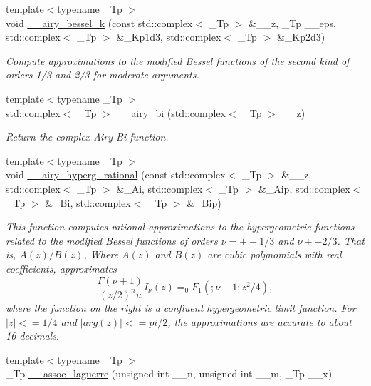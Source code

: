 \begin{DoxyCompactItemize}
\item 
{\footnotesize template$<$typename \+\_\+\+Tp $>$ }\\void \hyperlink{namespacestd_1_1____detail_a01098dbe1615b5be0833a7f3573f6510}{\+\_\+\+\_\+airy\+\_\+bessel\+\_\+k} (const std\+::complex$<$ \+\_\+\+Tp $>$ \&\+\_\+\+\_\+z, \+\_\+\+Tp \+\_\+\+\_\+eps, std\+::complex$<$ \+\_\+\+Tp $>$ \&\+\_\+\+Kp1d3, std\+::complex$<$ \+\_\+\+Tp $>$ \&\+\_\+\+Kp2d3)
\begin{DoxyCompactList}\small\item\em Compute approximations to the modified Bessel functions of the second kind of orders 1/3 and 2/3 for moderate arguments. \end{DoxyCompactList}\item 
{\footnotesize template$<$typename \+\_\+\+Tp $>$ }\\std\+::complex$<$ \+\_\+\+Tp $>$ \hyperlink{namespacestd_1_1____detail_ae5536305d721e393efe1a74f0e57653e}{\+\_\+\+\_\+airy\+\_\+bi} (std\+::complex$<$ \+\_\+\+Tp $>$ \+\_\+\+\_\+z)
\begin{DoxyCompactList}\small\item\em Return the complex Airy Bi function. \end{DoxyCompactList}\item 
{\footnotesize template$<$typename \+\_\+\+Tp $>$ }\\void \hyperlink{namespacestd_1_1____detail_aedc8a8cc144aa56f72728db7d62e3e62}{\+\_\+\+\_\+airy\+\_\+hyperg\+\_\+rational} (const std\+::complex$<$ \+\_\+\+Tp $>$ \&\+\_\+\+\_\+z, std\+::complex$<$ \+\_\+\+Tp $>$ \&\+\_\+\+Ai, std\+::complex$<$ \+\_\+\+Tp $>$ \&\+\_\+\+Aip, std\+::complex$<$ \+\_\+\+Tp $>$ \&\+\_\+\+Bi, std\+::complex$<$ \+\_\+\+Tp $>$ \&\+\_\+\+Bip)
\begin{DoxyCompactList}\small\item\em This function computes rational approximations to the hypergeometric functions related to the modified Bessel functions of orders $ \nu = +-1/3 $ and $ \nu +- 2/3 $. That is, $ A(z)/B(z) $, Where $ A(z) $ and $ B(z) $ are cubic polynomials with real coefficients, approximates \[ \frac{\Gamma(\nu+1)}{(z/2)^nu}I_\nu(z) = _0F_1 (;\nu+1;z^2/4), \] where the function on the right is a confluent hypergeometric limit function. For $ |z| <= 1/4 $ and $ |arg(z)| <= pi/2 $, the approximations are accurate to about 16 decimals. \end{DoxyCompactList}\item 
{\footnotesize template$<$typename \+\_\+\+Tp $>$ }\\\+\_\+\+Tp \hyperlink{namespacestd_1_1____detail_a7d47c4512f7c6914f5504fde6ffa31fb}{\+\_\+\+\_\+assoc\+\_\+laguerre} (unsigned int \+\_\+\+\_\+n, unsigned int \+\_\+\+\_\+m, \+\_\+\+Tp \+\_\+\+\_\+x)

\end{DoxyCompactItemize}
